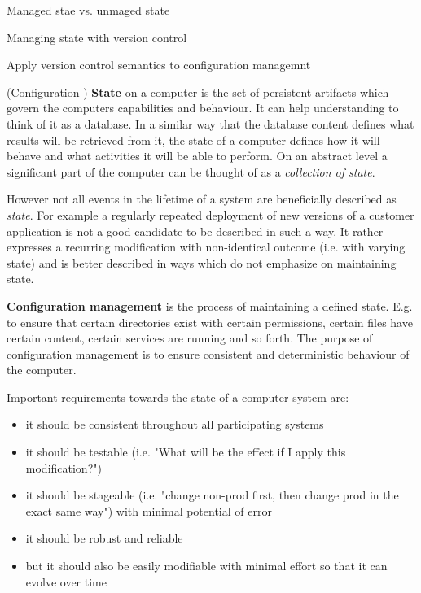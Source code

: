 \documentclass[12pt, a4paper]{article}
\begin{document}
Managed stae vs. unmaged state

Managing state with version control

Apply version control semantics to configuration managemnt



(Configuration-) \textbf{State} on a computer is the set of persistent artifacts which govern the computers capabilities and behaviour. It can help understanding to think of it as a database. In a similar way that the database content defines what results will be retrieved from it, the state of a computer defines how it will behave and what activities it will be able to perform. On an abstract level a significant part of the computer can be thought of as a \textit{collection of state}.

However not all events in the lifetime of a system are beneficially described as \textit{state}. For example a regularly repeated deployment of new versions of a customer application is not a good candidate to be described in such a way. It rather expresses a recurring modification with non-identical outcome (i.e. with varying state) and is better described in ways which do not emphasize on maintaining state.

\textbf{Configuration management} is the process of maintaining a defined state. E.g. to ensure that certain directories exist with certain permissions, certain files have certain content, certain services are running and so forth. The purpose of configuration management is to ensure consistent and deterministic behaviour of the computer.

\vspace{0.5cm}
\begin{minipage}{\textwidth}
Important requirements towards the state of a computer system are:

\begin{itemize}
  \item it should be consistent throughout all participating systems
  \item it should be testable (i.e. "What will be the effect if I apply this modification?")
  \item it should be stageable (i.e. "change non-prod first, then change prod in the exact same way") with minimal potential of error
  \item it should be robust and reliable
  \item but it should also be easily modifiable with minimal effort so that it can evolve over time
\end{itemize}
\end{minipage}
\vspace{0.5cm}
\end{document}
